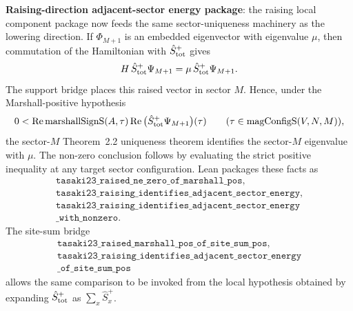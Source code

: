 \documentclass[a4paper,11pt]{article}
\begin{document}
\textbf{Raising-direction adjacent-sector energy package}: the
raising local component package now feeds the same sector-uniqueness
machinery as the lowering direction.  If
\(\Phi_{M+1}\) is an embedded eigenvector with eigenvalue \(\mu\), then
commutation of the Hamiltonian with \(\hat S^+_{\rm tot}\) gives
\[
  H\,\hat S^+_{\rm tot}\Psi_{M+1}
  = \mu\,\hat S^+_{\rm tot}\Psi_{M+1}.
\]
The support bridge places this raised vector in sector \(M\).  Hence,
under the Marshall-positive hypothesis
\[
  0 <
  \mathrm{Re}\,\mathrm{marshallSignS}(A,\tau)\,
  \mathrm{Re}\,
  \bigl(\hat S^+_{\rm tot}\Psi_{M+1}\bigr)(\tau)
  \qquad(\tau\in\mathrm{magConfigS}(V,N,M)),
\]
the sector-\(M\) Theorem~2.2 uniqueness theorem identifies the
sector-\(M\) eigenvalue with \(\mu\).  The non-zero conclusion follows
by evaluating the strict positive inequality at any target sector
configuration.  Lean packages these facts as
\[
\begin{gathered}
\texttt{tasaki23\_raised\_ne\_zero\_of\_marshall\_pos},\\
\texttt{tasaki23\_raising\_identifies\_adjacent\_sector\_energy},\\
\texttt{tasaki23\_raising\_identifies\_adjacent\_sector\_energy}\\
\texttt{\_with\_nonzero}.
\end{gathered}
\]
The site-sum bridge
\[
\begin{gathered}
\texttt{tasaki23\_raised\_marshall\_pos\_of\_site\_sum\_pos},\\
\texttt{tasaki23\_raising\_identifies\_adjacent\_sector\_energy}\\
\texttt{\_of\_site\_sum\_pos}
\end{gathered}
\]
allows the same comparison to be invoked from the local hypothesis
obtained by expanding \(\hat S^+_{\rm tot}\) as
\(\sum_x \hat S^+_x\).
\end{document}
